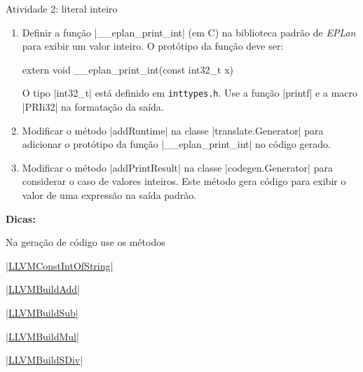 \documentclass[smaller]{beamer}
\newenvironment{tips}{%
  \textbf{Dicas:}\newline
  \begin{list}{*}{%
      \setlength{\topsep}{0pt}%
      \setlength{\itemsep}{0pt}%
      \setlength{\parsep}{0pt}%
    }%
  }{%
  \end{list}%
}
\newcommand{\lang}{\textsl{EPLan}}
\begin{document}
\begin{frame}{Atividade 2: literal inteiro}
\begin{enumerate}
\begin{itemize}
      \item modificar a regra do literal real para não casar com
      literais inteiros
    \end{itemize}

    \item Definir a função \pyginline|__eplan_print_int| (em C) na
    biblioteca padrão de \lang{} para exibir um valor inteiro. O
    protótipo da função deve ser:
\begin{pygmented}[]
extern void __eplan_print_int(const int32_t x)
\end{pygmented}
    O tipo \pyginline|int32_t| está definido em
    \texttt{inttypes.h}. Use a função \pyginline|printf| e a macro
    \pyginline|PRIi32| na formatação da saída.

    \item Modificar o método \pyginline|addRuntime| na classe
    \pyginline|translate.Generator| para adicionar o protótipo da função
    \pyginline|__eplan_print_int| no código gerado.
    
    \item Modificar o método \pyginline|addPrintResult| na classe
    \pyginline|codegen.Generator| para considerar o caso de valores
    inteiros. Este método gera código para exibir o valor de uma
    expressão na saída padrão.
  \end{enumerate}

  \begin{tips}
    \item Na geração de código use os métodos

    \href{http://bytedeco.org/javacpp-presets/llvm/apidocs/org/bytedeco/javacpp/LLVM.html#LLVMConstIntOfString-org.bytedeco.javacpp.LLVM.LLVMTypeRef-java.lang.String-byte-}{\pyginline|LLVMConstIntOfString|}

    \href{http://bytedeco.org/javacpp-presets/llvm/apidocs/org/bytedeco/javacpp/LLVM.html#LLVMBuildAdd-org.bytedeco.javacpp.LLVM.LLVMBuilderRef-org.bytedeco.javacpp.LLVM.LLVMValueRef-org.bytedeco.javacpp.LLVM.LLVMValueRef-java.lang.String-}{\pyginline|LLVMBuildAdd|}

    \href{http://bytedeco.org/javacpp-presets/llvm/apidocs/org/bytedeco/javacpp/LLVM.html#LLVMBuildSub-org.bytedeco.javacpp.LLVM.LLVMBuilderRef-org.bytedeco.javacpp.LLVM.LLVMValueRef-org.bytedeco.javacpp.LLVM.LLVMValueRef-java.lang.String-}{\pyginline|LLVMBuildSub|}

    \href{http://bytedeco.org/javacpp-presets/llvm/apidocs/org/bytedeco/javacpp/LLVM.html#LLVMBuildMul-org.bytedeco.javacpp.LLVM.LLVMBuilderRef-org.bytedeco.javacpp.LLVM.LLVMValueRef-org.bytedeco.javacpp.LLVM.LLVMValueRef-java.lang.String-}{\pyginline|LLVMBuildMul|}

    \href{http://bytedeco.org/javacpp-presets/llvm/apidocs/org/bytedeco/javacpp/LLVM.html#LLVMBuildSDiv-org.bytedeco.javacpp.LLVM.LLVMBuilderRef-org.bytedeco.javacpp.LLVM.LLVMValueRef-org.bytedeco.javacpp.LLVM.LLVMValueRef-java.lang.String-}{\pyginline|LLVMBuildSDiv|}
\end{tips}
\end{frame}
\end{document}
